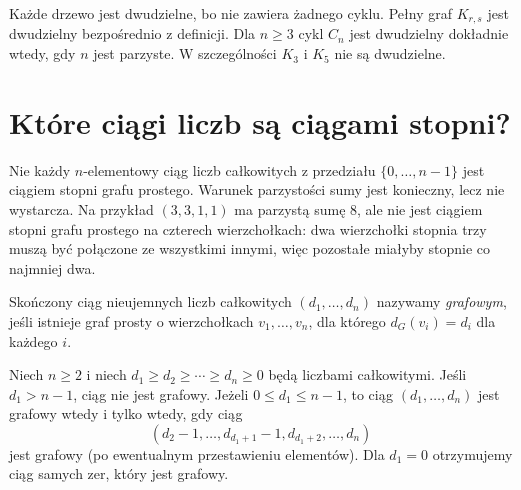 \begin{przyklad}
Każde drzewo jest dwudzielne, bo nie zawiera żadnego
cyklu. Pełny graf $K_{r,s}$ jest dwudzielny bezpośrednio
z definicji. Dla $n\ge3$ cykl $C_n$ jest dwudzielny
dokładnie wtedy, gdy $n$ jest parzyste. W szczególności
$K_3$ i $K_5$ nie są dwudzielne.
\end{przyklad}

\section{Które ciągi liczb są ciągami stopni?}
\label{sec:tg-havel}

Nie każdy $n$-elementowy ciąg liczb całkowitych z przedziału
$\{0,\ldots,n-1\}$ jest ciągiem stopni grafu prostego.
Warunek parzystości sumy jest konieczny, lecz nie wystarcza.
Na przykład $(3,3,1,1)$ ma parzystą sumę $8$, ale nie jest
ciągiem stopni grafu prostego na czterech wierzchołkach:
dwa wierzchołki stopnia trzy muszą być połączone ze wszystkimi
innymi, więc pozostałe miałyby stopnie co najmniej dwa.

\begin{definicja}
Skończony ciąg nieujemnych liczb całkowitych
$(d_1,\ldots,d_n)$ nazywamy \emph{grafowym},
jeśli istnieje graf prosty o wierzchołkach
$v_1,\ldots,v_n$, dla którego $d_G(v_i)=d_i$
dla każdego $i$.
\end{definicja}

\begin{twierdzenie}
Niech $n\ge2$ i niech
$d_1\ge d_2\ge\cdots\ge d_n\ge0$ będą liczbami
całkowitymi. Jeśli $d_1>n-1$, ciąg nie jest grafowy.
Jeżeli $0\le d_1\le n-1$, to ciąg
$(d_1,\ldots,d_n)$ jest grafowy wtedy i tylko
wtedy, gdy ciąg
\[
(d_2-1,\ldots,d_{d_1+1}-1,
  d_{d_1+2},\ldots,d_n)
\]
jest grafowy (po ewentualnym przestawieniu elementów).
Dla $d_1=0$ otrzymujemy ciąg samych zer, który jest
grafowy.
\end{twierdzenie}


